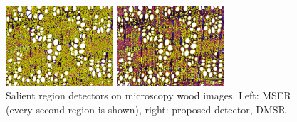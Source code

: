 \documentclass[conference,compsoc]{IEEEtran}
\begin{document}
   \begin{figure}[htb]

\begin{minipage}[b]{.49\linewidth}
  \centering
  \centerline{\includegraphics[width=4.0cm]{mserWood}}
\end{minipage}
\hfill
\begin{minipage}[b]{0.49\linewidth}
  \centering
  \centerline{\includegraphics[width=4.0cm]{dmsrWood}}
\end{minipage}
\caption{Salient region detectors on microscopy wood images. Left: MSER (every second region is shown), right: proposed detector, DMSR}
\label{fig:wood}
%
\end{figure}
\vspace{-0.4cm}
\end{document}
